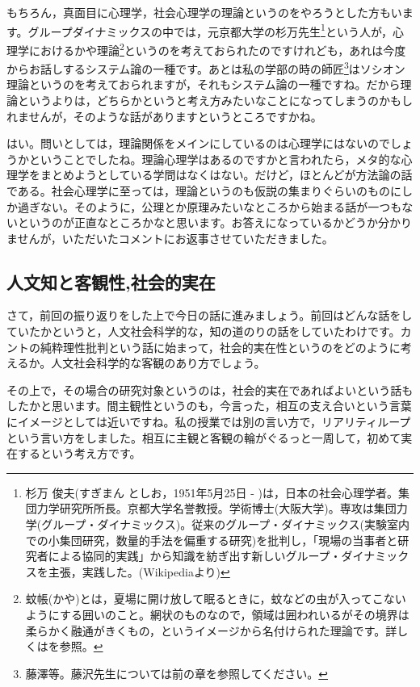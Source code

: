 \documentclass{ltjsbook}
\begin{document}
もちろん，真面目に心理学，社会心理学の理論というのをやろうとした方もいます。グループダイナミックスの中では，元京都大学の杉万先生\footnote{杉万 俊夫(すぎまん としお，1951年5月25日 - )は，日本の社会心理学者。集団力学研究所所長。京都大学名誉教授。学術博士(大阪大学)。専攻は集団力学(グループ・ダイナミックス)。従来のグループ・ダイナミックス(実験室内での小集団研究，数量的手法を偏重する研究)を批判し，「現場の当事者と研究者による協同的実践」から知識を紡ぎ出す新しいグループ・ダイナミックスを主張，実践した。(Wikipediaより)}という人が，心理学におけるかや理論\footnote{蚊帳(かや)とは，夏場に開け放して眠るときに，蚊などの虫が入ってこないようにする囲いのこと。網状のものなので，領域は囲われいるがその境界は柔らかく融通がきくもの，というイメージから名付けられた理論です。詳しくは\parencite{Sugiman1992}を参照。}というのを考えておられたのですけれども，あれは今度からお話しするシステム論の一種です。あとは私の学部の時の師匠\footnote{藤澤等。藤沢先生については前の章を参照してください。}はソシオン理論というのを考えておられますが，それもシステム論の一種ですね。だから理論というよりは，どちらかというと考え方みたいなことになってしまうのかもしれませんが，そのような話がありますというところですかね。

はい。問いとしては，理論関係をメインにしているのは心理学にはないのでしょうかということでしたね。理論心理学はあるのですかと言われたら，メタ的な心理学をまとめようとしている学問はなくはない。だけど，ほとんどが方法論の話である。社会心理学に至っては，理論というのも仮説の集まりぐらいのものにしか過ぎない。そのように，公理とか原理みたいなところから始まる話が一つもないというのが正直なところかなと思います。お答えになっているかどうか分かりませんが，いただいたコメントにお返事させていただきました。

\subsection{人文知と客観性,社会的実在}
さて，前回の振り返りをした上で今日の話に進みましょう。前回はどんな話をしていたかというと，人文社会科学的な，知の道のりの話をしていたわけです。カントの純粋理性批判という話に始まって，社会的実在性というのをどのように考えるか。人文社会科学的な客観のあり方でしょう。

その上で，その場合の研究対象というのは，社会的実在であればよいという話もしたかと思います。間主観性というのも，今言った，相互の支え合いという言葉にイメージとしては近いですね。私の授業では別の言い方で，リアリティループという言い方をしました。相互に主観と客観の輪がぐるっと一周して，初めて実在するという考え方です。
\end{document}
